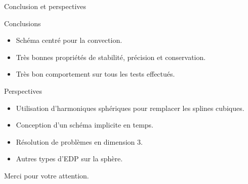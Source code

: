 \documentclass[11pt]{beamer}
\begin{document}
\begin{frame}{Conclusion et perspectives}
\begin{block}{Conclusions}
\begin{itemize}
\item Schéma centré pour la convection.
\item Très bonnes propriétés de stabilité, précision et conservation.
\item Très bon comportement sur tous les tests effectués.
\end{itemize}
\end{block}

\begin{block}{Perspectives}
\begin{itemize}
\item Utilisation d'harmoniques sphériques pour remplacer les splines cubiques.
\item Conception d'un schéma implicite en temps.
\item Résolution de problèmes en dimension 3.
\item Autres types d'EDP sur la sphère.
\end{itemize}
\end{block}
\end{frame}


\begin{frame}
\begin{center}
Merci pour votre attention.
\end{center}
\end{frame}
\end{document}
